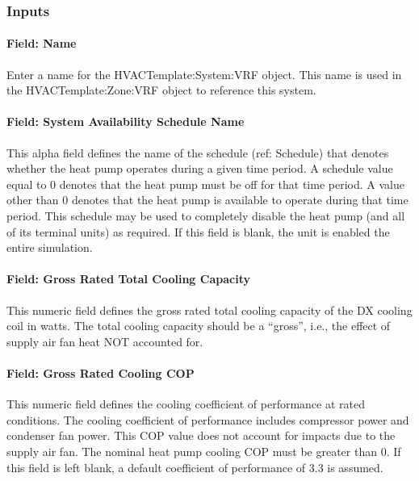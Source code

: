 \subsubsection{Inputs}\label{inputs-14-005}

\paragraph{Field: Name}\label{field-name-1-021}

Enter a name for the HVACTemplate:System:VRF object. This name is used in the HVACTemplate:Zone:VRF object to reference this system.

\paragraph{Field: System Availability Schedule Name}\label{field-system-availability-schedule-name-6}

This alpha field defines the name of the schedule (ref: Schedule) that denotes whether the heat pump operates during a given time period. A schedule value equal to 0 denotes that the heat pump must be off for that time period. A value other than 0 denotes that the heat pump is available to operate during that time period. This schedule may be used to completely disable the heat pump (and all of its terminal units) as required. If this field is blank, the unit is enabled the entire simulation.

\paragraph{Field: Gross Rated Total Cooling Capacity}\label{field-gross-rated-total-cooling-capacity-000}

This numeric field defines the gross rated total cooling capacity of the DX cooling coil in watts. The total cooling capacity should be a ``gross'', i.e., the effect of supply air fan heat NOT accounted for.

\paragraph{Field: Gross Rated Cooling COP}\label{field-gross-rated-cooling-cop-000}

This numeric field defines the cooling coefficient of performance at rated conditions. The cooling coefficient of performance includes compressor power and condenser fan power. This COP value does not account for impacts due to the supply air fan. The nominal heat pump cooling COP must be greater than 0. If this field is left blank, a default coefficient of performance of 3.3 is assumed.

